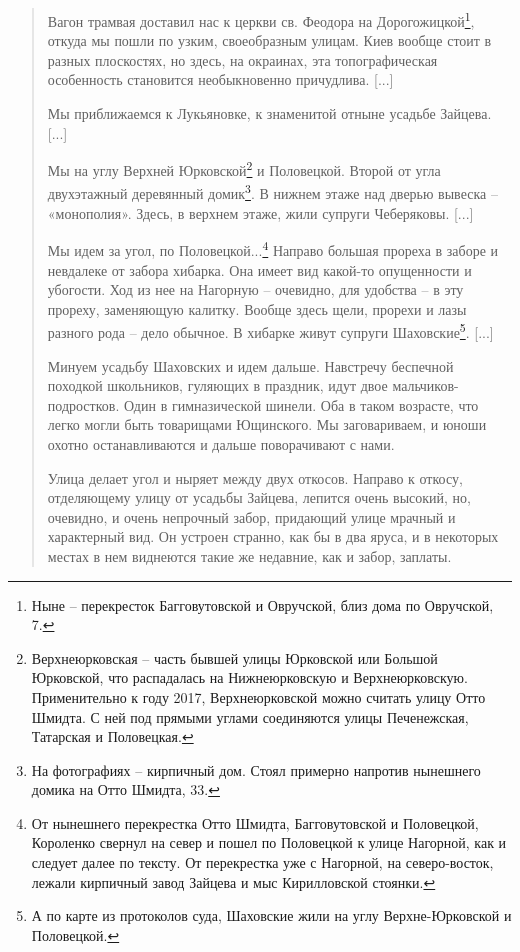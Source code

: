 \begin{quotation}
Вагон трамвая доставил нас к церкви св. Феодора на Дорогожицкой\footnote{Ныне – перекресток Багговутовской и Овручской, близ дома по Овручской, 7.}, откуда мы пошли по узким, своеобразным улицам. Киев вообще стоит в разных плоскостях, но здесь, на окраинах, эта топографическая особенность становится необыкновенно причудлива. [...]

Мы приближаемся к Лукьяновке, к знаменитой отныне усадьбе Зайцева. [...]

Мы на углу Верхней Юрковской\footnote{Верхнеюрковская – часть бывшей улицы Юрковской или Большой Юрковской, что распадалась на Нижнеюрковскую и Верхнеюрковскую. Применительно к году 2017, Верхнеюрковской можно считать улицу Отто Шмидта. С ней под прямыми углами соединяются улицы Печенежская, Татарская и Половецкая.} и Половецкой. Второй от угла двухэтажный деревянный домик\footnote{На фотографиях – кирпичный дом. Стоял примерно напротив нынешнего домика на Отто Шмидта, 33.}. В нижнем этаже над дверью вывеска – «монополия». Здесь, в верхнем этаже, жили супруги Чеберяковы. [...]

Мы идем за угол, по Половецкой...\footnote{От нынешнего перекрестка Отто Шмидта, Багговутовской и Половецкой, Короленко свернул на север и пошел по Половецкой к улице Нагорной, как и следует далее по тексту. От перекрестка уже с Нагорной, на северо-восток, лежали кирпичный завод Зайцева и мыс Кирилловской стоянки.} Направо большая прореха в заборе и невдалеке от забора хибарка. Она имеет вид какой-то опущенности и убогости. Ход из нее на Нагорную – очевидно, для удобства – в эту прореху, заменяющую калитку. Вообще здесь щели, прорехи и лазы разного рода – дело обычное. В хибарке живут супруги Шаховские\footnote{А по карте из протоколов суда, Шаховские жили на углу Верхне-Юрковской и Половецкой.}. [...]

Минуем усадьбу Шаховских и идем дальше. Навстречу беспечной походкой школьников, гуляющих в праздник, идут двое мальчиков-подростков. Один в гимназической шинели. Оба в таком возрасте, что легко могли быть товарищами Ющинского. Мы заговариваем, и юноши охотно останавливаются и дальше поворачивают с нами.

Улица делает угол и ныряет между двух откосов. Направо к откосу, отделяющему улицу от усадьбы Зайцева, лепится очень высокий, но, очевидно, и очень непрочный забор, придающий улице мрачный и характерный вид. Он устроен странно, как бы в два яруса, и в некоторых местах в нем виднеются такие же недавние, как и забор, заплаты. 


\end{quotation}
